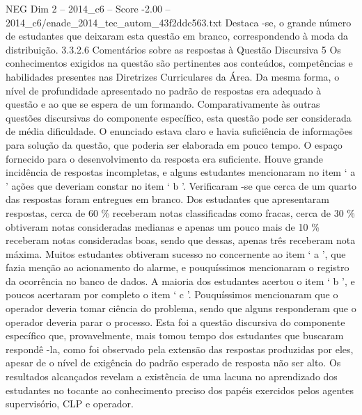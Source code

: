 \begin{textsample}{NEG Dim 2 – 2014\_c6 – Score -2.00 – 2014\_c6/enade\_2014\_tec\_autom\_43f2ddc563.txt}
Destaca -se, o grande número de estudantes que deixaram esta questão em branco, correspondendo à moda da distribuição. 3.3.2.6 Comentários sobre as respostas à Questão Discursiva 5 Os conhecimentos exigidos na questão são pertinentes aos conteúdos, competências e habilidades presentes nas Diretrizes Curriculares da Área.
Da mesma forma, o nível de profundidade apresentado no padrão de respostas era adequado à questão e ao que se espera de um formando.
Comparativamente às outras questões discursivas do componente específico, esta questão pode ser considerada de média dificuldade.
O enunciado estava claro e havia suficiência de informações para solução da questão, que poderia ser elaborada em pouco tempo.
O espaço fornecido para o desenvolvimento da resposta era suficiente.
Houve grande incidência de respostas incompletas, e alguns estudantes mencionaram no item ‘ a ’ ações que deveriam constar no item ‘ b ’.
Verificaram -se que cerca de um quarto das respostas foram entregues em branco.
Dos estudantes que apresentaram respostas, cerca de 60 \% receberam notas classificadas como fracas, cerca de 30 \% obtiveram notas consideradas medianas e apenas um pouco mais de 10 \% receberam notas consideradas boas, sendo que dessas, apenas três receberam nota máxima.
Muitos estudantes obtiveram sucesso no concernente ao item ‘ a ’, que fazia menção ao acionamento do alarme, e pouquíssimos mencionaram o registro da ocorrência no banco de dados.
A maioria dos estudantes acertou o item ‘ b ’, e poucos acertaram por completo o item ‘ c ’.
Pouquíssimos mencionaram que o operador deveria tomar ciência do problema, sendo que alguns responderam que o operador deveria parar o processo.
Esta foi a questão discursiva do componente específico que, provavelmente, mais tomou tempo dos estudantes que buscaram respondê -la, como foi observado pela extensão das respostas produzidas por eles, apesar de o nível de exigência do padrão esperado de resposta não ser alto.
Os resultados alcançados revelam a existência de uma lacuna no aprendizado dos estudantes no tocante ao conhecimento preciso dos papéis exercidos pelos agentes supervisório, CLP e operador.

\end{textsample}
